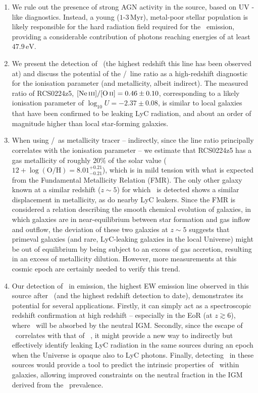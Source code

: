 \begin{enumerate}[label=--]
    \item We rule out the presence of strong AGN activity in the source, based on UV -like diagnostics. Instead, a young ($1$-$3 \, \mathrm{Myr}$), metal-poor stellar population is likely responsible for the hard radiation field required for the \CIV\ emission, providing a considerable contribution of photons reaching energies of at least $47.9 \, \mathrm{eV}$.
    
    \item We present the detection of \NeIII\ (the highest redshift this line has been observed at) and discuss the potential of the \NeIII/\OII\ line ratio as a high-redshift diagnostic for the ionisation parameter (and metallicity, albeit indirect). The measured ratio of RCS0224z5, $\NeIII/\OII = 0.46 \pm 0.10$, corresponding to a likely ionisation parameter of $\log_{10} U = -2.37 \pm 0.08$, is similar to local galaxies that have been confirmed to be leaking LyC radiation, and about an order of magnitude higher than local star-forming galaxies.
    
    \item When using \NeIII/\OII\ as metallicity tracer -- indirectly, since the line ratio principally correlates with the ionisation parameter -- we estimate that RCS0224z5 has a gas metallicity of roughly $20\%$ of the solar value ($12 + \log \left ( \text{O/H} \right) = 8.01_{-0.21}^{+0.21}$), which is in mild tension with what is expected from the Fundamental Metallicity Relation (FMR). The only other galaxy known at a similar redshift ($z \sim 5$) for which \NeIII\ is detected shows a similar displacement in metallicity, as do nearby LyC leakers. Since the FMR is considered a relation describing the smooth chemical evolution of galaxies, in which galaxies are in near-equilibrium between star formation and gas inflow and outflow, the deviation of these two galaxies at $z \sim 5$ suggests that primeval galaxies (and rare, LyC-leaking galaxies in the local Universe) might be out of equilibrium by being subject to an excess of gas accretion, resulting in an excess of metallicity dilution. However, more measurements at this cosmic epoch are certainly needed to verify this trend.
    
    \item Our detection of \MgII\ in emission, the highest EW emission line observed in this source after \lya\ (and the highest redshift detection to date), demonstrates its potential for several applications. Firstly, it can simply act as a spectroscopic redshift confirmation at high redshift -- especially in the EoR (at $z \gtrsim 6$), where \lya\ will be absorbed by the neutral IGM. Secondly, since the escape of \MgII\ correlates with that of \lya\ \citep{2018ApJ...855...96H}, it might provide a new way to indirectly but effectively identify leaking LyC radiation in the same sources during an epoch when the Universe is opaque also to LyC photons. Finally, detecting \MgII\ in these sources would provide a tool to predict the intrinsic properties of \lya\ within galaxies, allowing improved constraints on the neutral fraction in the IGM derived from the \lya\ prevalence.
\end{enumerate}